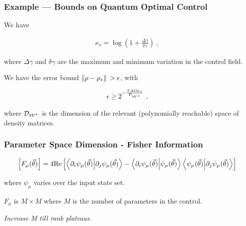 \begin{frame}
    \frametitle{Example --- Bounds on Quantum Optimal Control}
    
    We have

    \begin{gather*}
        \kappa_s = \log (1 + \frac{\Delta\gamma}{\delta\gamma})~,
    \end{gather*}

    where \(\Delta\gamma\) and \(\delta\gamma\) are the maximum and minimum
    variation in the control field.

    We have the error bound 
    \(\norm*{\rho-\rho_*} > \epsilon\), with

    \begin{gather*}
        \epsilon \geq 2^{-\frac{T\Delta\Omega\kappa_s}{\mathcal{D}_{\mathcal{W^+}}}}~,
    \end{gather*}

    where \(\mathcal{D}_{\mathcal{W^+}}\) is the dimension of the relevant
    (polynomially reachable) space of density matrices.


\end{frame}

\begin{frame}
    \frametitle{Parameter Space Dimension - Fisher Information}

    \begin{gather}
        \left[ F_\mu (\vec{\theta})\right] = 
                4\text{Re}
                \left[
                    \braket{\partial_i \psi_\mu(\vec{\theta})}{\partial_j \psi_\mu(\vec{\theta})}
                    -
                    \braket{\partial_i \psi_\mu(\vec{\theta})}{\psi_\mu(\vec{\theta})}
                    \braket{\psi_\mu(\vec{\theta})}{\partial_j \psi_\mu(\vec{\theta})}
                \right]
    \end{gather}

    where \(\psi_\mu\) varies over the input state set.

    \(F_\mu\) is \(M\times M\) where \(M\) is the number of parameters in the
    control. \\

    \pause
    
    \begin{center}
        \emph{Increase M till rank plateaus.}
    \end{center}


\end{frame}


